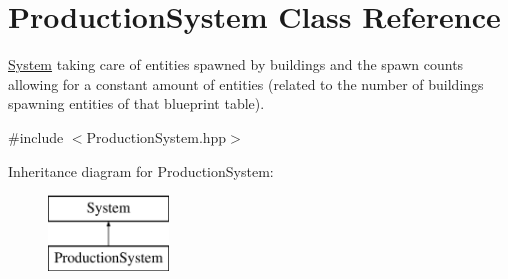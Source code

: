 \hypertarget{class_production_system}{}\section{Production\+System Class Reference}
\label{class_production_system}


\hyperlink{class_system}{System} taking care of entities spawned by buildings and the spawn counts allowing for a constant amount of entities (related to the number of buildings spawning entities of that blueprint table).  




{\ttfamily \#include $<$Production\+System.\+hpp$>$}

Inheritance diagram for Production\+System\+:\begin{figure}[H]
\begin{center}
\leavevmode
\includegraphics[height=2.000000cm]{class_production_system}
\end{center}
\end{figure}
